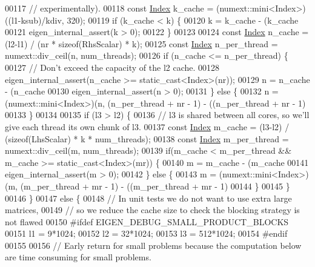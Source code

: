 \begin{DoxyCode}
00117     \textcolor{comment}{// experimentally).}
00118     \textcolor{keyword}{const} \hyperlink{namespace_eigen_a62e77e0933482dafde8fe197d9a2cfde}{Index} k\_cache = (numext::mini<Index>)((l1-ksub)/kdiv, 320);
00119     \textcolor{keywordflow}{if} (k\_cache < k) \{
00120       k = k\_cache - (k\_cache %
00121       eigen\_internal\_assert(k > 0);
00122     \}
00123 
00124     \textcolor{keyword}{const} \hyperlink{namespace_eigen_a62e77e0933482dafde8fe197d9a2cfde}{Index} n\_cache = (l2-l1) / (nr * \textcolor{keyword}{sizeof}(RhsScalar) * k);
00125     \textcolor{keyword}{const} \hyperlink{namespace_eigen_a62e77e0933482dafde8fe197d9a2cfde}{Index} n\_per\_thread = numext::div\_ceil(n, num\_threads);
00126     \textcolor{keywordflow}{if} (n\_cache <= n\_per\_thread) \{
00127       \textcolor{comment}{// Don't exceed the capacity of the l2 cache.}
00128       eigen\_internal\_assert(n\_cache >= static\_cast<Index>(nr));
00129       n = n\_cache - (n\_cache %
00130       eigen\_internal\_assert(n > 0);
00131     \} \textcolor{keywordflow}{else} \{
00132       n = (numext::mini<Index>)(n, (n\_per\_thread + nr - 1) - ((n\_per\_thread + nr - 1) %
00133     \}
00134 
00135     \textcolor{keywordflow}{if} (l3 > l2) \{
00136       \textcolor{comment}{// l3 is shared between all cores, so we'll give each thread its own chunk of l3.}
00137       \textcolor{keyword}{const} \hyperlink{namespace_eigen_a62e77e0933482dafde8fe197d9a2cfde}{Index} m\_cache = (l3-l2) / (\textcolor{keyword}{sizeof}(LhsScalar) * k * num\_threads);
00138       \textcolor{keyword}{const} \hyperlink{namespace_eigen_a62e77e0933482dafde8fe197d9a2cfde}{Index} m\_per\_thread = numext::div\_ceil(m, num\_threads);
00139       \textcolor{keywordflow}{if}(m\_cache < m\_per\_thread && m\_cache >= static\_cast<Index>(mr)) \{
00140         m = m\_cache - (m\_cache %
00141         eigen\_internal\_assert(m > 0);
00142       \} \textcolor{keywordflow}{else} \{
00143         m = (numext::mini<Index>)(m, (m\_per\_thread + mr - 1) - ((m\_per\_thread + mr - 1) %
00144       \}
00145     \}
00146   \}
00147   \textcolor{keywordflow}{else} \{
00148     \textcolor{comment}{// In unit tests we do not want to use extra large matrices,}
00149     \textcolor{comment}{// so we reduce the cache size to check the blocking strategy is not flawed}
00150 \textcolor{preprocessor}{#ifdef EIGEN\_DEBUG\_SMALL\_PRODUCT\_BLOCKS}
00151     l1 = 9*1024;
00152     l2 = 32*1024;
00153     l3 = 512*1024;
00154 \textcolor{preprocessor}{#endif}
00155 
00156     \textcolor{comment}{// Early return for small problems because the computation below are time consuming for small problems.}

\end{DoxyCode}

